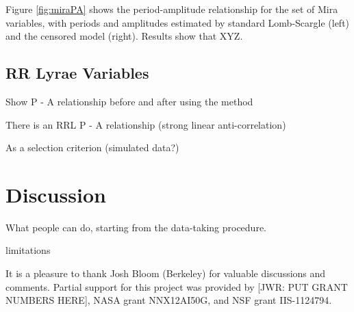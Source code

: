 \documentclass[12pt,preprint]{aastex}
\begin{document}
Figure \ref{fig:miraPA} shows the period-amplitude relationship for the set of Mira variables, with periods and amplitudes estimated by standard Lomb-Scargle (left) and the censored model (right).  Results show that XYZ.
 



 \subsection{RR Lyrae Variables}

  Show P - A relationship before and after using the method

There is an RRL P - A relationship (strong linear anti-correlation)

As a selection criterion (simulated data?)


\section{Discussion}
\label{sec:discussion}

What people can do, starting from the data-taking procedure.

limitations


\acknowledgements It is a pleasure to thank Josh Bloom (Berkeley) for
valuable discussions and comments.  Partial support for this project
was provided by [JWR: PUT GRANT NUMBERS HERE], NASA grant NNX12AI50G,
and NSF grant IIS-1124794.


\end{document}
